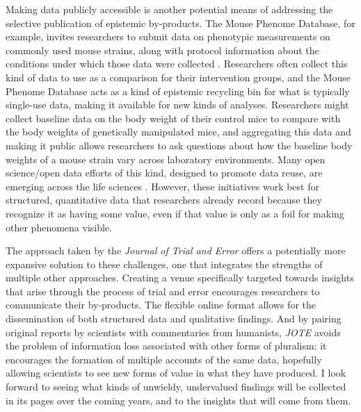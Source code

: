 \documentclass[twocolumn, serif, meta, authordate]{jote-article}
\begin{document}
Making data publicly accessible is another potential means of addressing the selective publication of epistemic by-products. The Mouse Phenome Database, for example, invites researchers to submit data on phenotypic measurements on commonly used mouse strains, along with protocol information about the conditions under which those data were collected \parencite{Bogue2004}. Researchers often collect this kind of data to use as a comparison for their intervention groups, and the Mouse Phenome Database acts as a kind of epistemic recycling bin for what is typically single-use data, making it available for new kinds of analyses. Researchers might collect baseline data on the body weight of their control mice to compare with the body weights of genetically manipulated mice, and aggregating this data and making it public allows researchers to ask questions about how the baseline body weights of a mouse strain vary across laboratory environments. Many open science/open data efforts of this kind, designed to promote data reuse, are emerging across the life sciences \parencite{Leonelli2016}. However, these initiatives work best for structured, quantitative data that researchers already record because they recognize it as having some value, even if that value is only as a foil for making other phenomena visible.

The approach taken by the \emph{Journal of Trial and Error} offers a potentially more expansive solution to these challenges, one that integrates the strengths of multiple other approaches. Creating a venue specifically targeted towards insights that arise through the process of trial and error encourages researchers to communicate their by-products. The flexible online format allows for the dissemination of both structured data and qualitative findings. And by pairing original reports by scientists with commentaries from humanists, \emph{JOTE} avoids the problem of information loss associated with other forms of pluralism: it encourages the formation of multiple accounts of the same data, hopefully allowing scientists to see new forms of value in what they have produced. I look forward to seeing what kinds of unwieldy, undervalued findings will be collected in its pages over the coming years, and to the insights that will come from them. 

\setlength{\bibhang}{\parindent}
 {} \printbibliography
\end{document}
